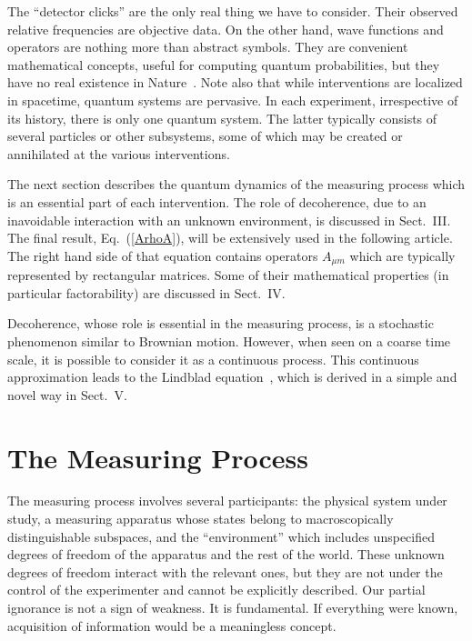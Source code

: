 \documentclass[12pt]{article}
\def\Eq{Eq.~(\ref}
\begin{document}
The ``detector clicks'' are the only real thing we have to consider.
Their observed relative frequencies are objective data. On the other
hand, wave functions and operators are nothing more than abstract
symbols. They are convenient mathematical concepts, useful for computing
quantum probabilities, but they have no real existence in
Nature~\cite{Stapp}. Note also that while interventions are localized in
spacetime, quantum systems are pervasive. In each experiment,
irrespective of its history, there is only one quantum system. The
latter typically consists of several particles or other subsystems, some
of which may be created or annihilated at the various interventions.

The next section describes the quantum dynamics of the measuring process
which is an essential part of each intervention. The role of
decoherence, due to an inavoidable interaction with an unknown
environment, is discussed in Sect.~III. The final result, \Eq{ArhoA}),
will be extensively used in the following article. The right hand side
of that equation contains operators $A_{\mu m}$ which are typically
represented by rectangular matrices. Some of their mathematical
properties (in particular factorability) are discussed in Sect.~IV.

Decoherence, whose role is essential in the measuring process, is a
stochastic phenomenon similar to Brownian motion. However, when seen on
a coarse time scale, it is possible to consider it as a continuous
process. This continuous approximation leads to the Lindblad
equation~\cite{lindblad}, which is derived in a simple and novel way in
Sect.~V.

\section{The Measuring Process}

The measuring process involves several participants: the physical system
under study, a measuring apparatus whose states belong to
macroscopically distinguishable subspaces, and the ``environment'' which
includes unspecified degrees of freedom of the apparatus and the rest of
the world. These unknown degrees of freedom interact with the relevant
ones, but they are not under the control of the experimenter and cannot
be explicitly described. Our partial ignorance is not a sign of
weakness. It is fundamental. If everything were known, acquisition of
information would be a meaningless concept.
\end{document}
